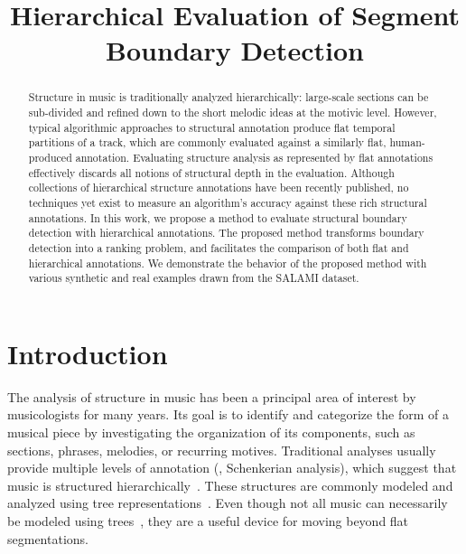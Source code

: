 \documentclass{article}
\title{Hierarchical Evaluation of Segment Boundary Detection}
\begin{document}
%
\maketitle
%
\begin{abstract}
Structure in music is traditionally analyzed hierarchically: large-scale sections can be sub-divided and refined down to the short melodic ideas at the motivic level. 
However, typical algorithmic approaches to structural annotation produce flat temporal partitions of a track, which are commonly evaluated against a similarly flat, human-produced
annotation. Evaluating structure analysis as represented by flat annotations effectively discards all notions of structural depth in the evaluation.
Although collections of hierarchical structure annotations have been recently published, no techniques yet exist to measure an algorithm's accuracy against these rich structural annotations.
In this work, we propose a method to evaluate structural boundary detection with hierarchical annotations.
The proposed method transforms boundary detection into a ranking problem, and facilitates the comparison of
both flat and hierarchical annotations.
We demonstrate the behavior of the proposed method with various synthetic and real
examples drawn from the SALAMI dataset. 
\end{abstract}
%
\section{Introduction}\label{sec:introduction}

The analysis of structure in music has been a principal area of interest by musicologists for many years.
Its goal is to identify and categorize the form of a musical piece by investigating the organization of its components, such as sections, phrases, melodies, or recurring motives.
Traditional analyses usually provide multiple levels of annotation (\eg, Schenkerian analysis), which suggest that music is structured hierarchically~\cite{Lerdahl1983a}.
These structures are commonly modeled and analyzed using tree representations~\cite{Lerdahl1983}.
Even though not all music can necessarily be modeled using trees~\cite{Wiggins2015}, they are a useful device for moving beyond flat segmentations.
\end{document}
